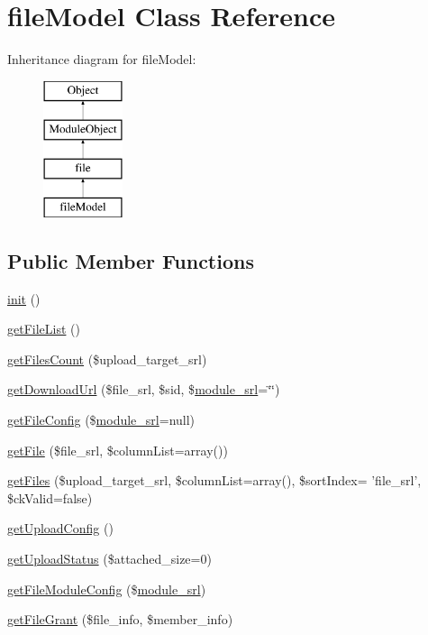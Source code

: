 \hypertarget{classfileModel}{\section{file\+Model Class Reference}
\label{classfileModel}
}
Inheritance diagram for file\+Model\+:\begin{figure}[H]
\begin{center}
\leavevmode
\includegraphics[height=4.000000cm]{classfileModel}
\end{center}
\end{figure}
\subsection*{Public Member Functions}
\begin{DoxyCompactItemize}
\item 
\hyperlink{classfileModel_a5dd9542d5c0ed61a7dd0158900ff5c92}{init} ()
\item 
\hyperlink{classfileModel_ad2b29057d5e61a15cb2caf794fc12291}{get\+File\+List} ()
\item 
\hyperlink{classfileModel_a37f83c04ce8adc09f576b94e04264f5b}{get\+Files\+Count} (\$upload\+\_\+target\+\_\+srl)
\item 
\hyperlink{classfileModel_ad626512a63e99f97d0e5a6fac7dae8c8}{get\+Download\+Url} (\$file\+\_\+srl, \$sid, \$\hyperlink{ko_8install_8php_a370bb6450fab1da3e0ed9f484a38b761}{module\+\_\+srl}=\char`\"{}\char`\"{})
\item 
\hyperlink{classfileModel_a81beeda11f761f561adb60ebc72d6187}{get\+File\+Config} (\$\hyperlink{ko_8install_8php_a370bb6450fab1da3e0ed9f484a38b761}{module\+\_\+srl}=null)
\item 
\hyperlink{classfileModel_a1475f2eb6cc740bf7f5ef67a4654fb24}{get\+File} (\$file\+\_\+srl, \$column\+List=array())
\item 
\hyperlink{classfileModel_a149c4f1e8710ec09c7dab5284b72bd48}{get\+Files} (\$upload\+\_\+target\+\_\+srl, \$column\+List=array(), \$sort\+Index= 'file\+\_\+srl', \$ck\+Valid=false)
\item 
\hyperlink{classfileModel_a0d268e1f840c7495de96ed511c7053fc}{get\+Upload\+Config} ()
\item 
\hyperlink{classfileModel_a63c3d6b41db33e55521cd3f0b10ab493}{get\+Upload\+Status} (\$attached\+\_\+size=0)
\item 
\hyperlink{classfileModel_aefe867916bce4a5f3451bb9afc464844}{get\+File\+Module\+Config} (\$\hyperlink{ko_8install_8php_a370bb6450fab1da3e0ed9f484a38b761}{module\+\_\+srl})
\item 
\hyperlink{classfileModel_a129e251c2a4ed575126c902a64ed3f59}{get\+File\+Grant} (\$file\+\_\+info, \$member\+\_\+info)
\end{DoxyCompactItemize}
